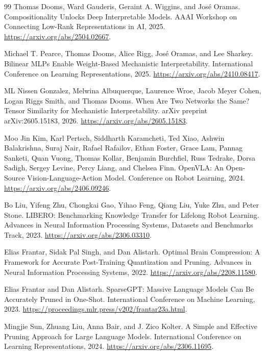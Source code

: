 \documentclass{article}
\begin{document}
\clearpage
\begin{thebibliography}{99}
Thomas Dooms, Ward Gauderis, Geraint A. Wiggins, and Jos\'e Oramas.
\newblock Compositionality Unlocks Deep Interpretable Models.
\newblock AAAI Workshop on Connecting Low-Rank Representations in AI, 2025.
\newblock \url{https://arxiv.org/abs/2504.02667}.

Michael T. Pearce, Thomas Dooms, Alice Rigg, Jos\'e Oramas, and Lee Sharkey.
\newblock Bilinear MLPs Enable Weight-Based Mechanistic Interpretability.
\newblock International Conference on Learning Representations, 2025.
\newblock \url{https://arxiv.org/abs/2410.08417}.

ML Nissen Gonzalez, Melwina Albuquerque, Laurence Wroe, Jacob Meyer Cohen, Logan Riggs Smith, and Thomas Dooms.
\newblock When Are Two Networks the Same? Tensor Similarity for Mechanistic Interpretability.
\newblock arXiv preprint arXiv:2605.15183, 2026.
\newblock \url{https://arxiv.org/abs/2605.15183}.

Moo Jin Kim, Karl Pertsch, Siddharth Karamcheti, Ted Xiao, Ashwin Balakrishna, Suraj Nair, Rafael Rafailov, Ethan Foster, Grace Lam, Pannag Sanketi, Quan Vuong, Thomas Kollar, Benjamin Burchfiel, Russ Tedrake, Dorsa Sadigh, Sergey Levine, Percy Liang, and Chelsea Finn.
\newblock OpenVLA: An Open-Source Vision-Language-Action Model.
\newblock Conference on Robot Learning, 2024.
\newblock \url{https://arxiv.org/abs/2406.09246}.

Bo Liu, Yifeng Zhu, Chongkai Gao, Yihao Feng, Qiang Liu, Yuke Zhu, and Peter Stone.
\newblock LIBERO: Benchmarking Knowledge Transfer for Lifelong Robot Learning.
\newblock Advances in Neural Information Processing Systems, Datasets and Benchmarks Track, 2023.
\newblock \url{https://arxiv.org/abs/2306.03310}.

Elias Frantar, Sidak Pal Singh, and Dan Alistarh.
\newblock Optimal Brain Compression: A Framework for Accurate Post-Training Quantization and Pruning.
\newblock Advances in Neural Information Processing Systems, 2022.
\newblock \url{https://arxiv.org/abs/2208.11580}.

Elias Frantar and Dan Alistarh.
\newblock SparseGPT: Massive Language Models Can Be Accurately Pruned in One-Shot.
\newblock International Conference on Machine Learning, 2023.
\newblock \url{https://proceedings.mlr.press/v202/frantar23a.html}.

Mingjie Sun, Zhuang Liu, Anna Bair, and J. Zico Kolter.
\newblock A Simple and Effective Pruning Approach for Large Language Models.
\newblock International Conference on Learning Representations, 2024.
\newblock \url{https://arxiv.org/abs/2306.11695}.


\end{thebibliography}
\end{document}
